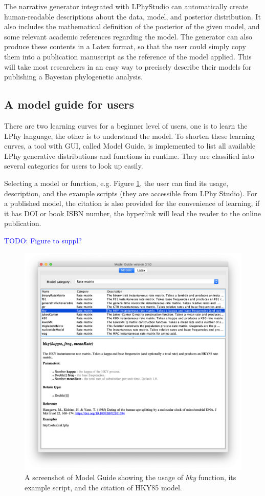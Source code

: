 \documentclass[10pt,letterpaper,table]{article}
\begin{document}
{The narrative generator integrated with LPhyStudio can automatically create human-readable descriptions about the data, model, and posterior distribution. 
It also includes the mathematical definition of the posterior of the given model, and some relevant academic references regarding the model. 
The generator can also produce these contents in a Latex format, so that the user could simply copy them into a publication manuscript as the reference of the model applied. 
This will take most researchers in an easy way to precisely describe their models for publishing a Bayesian phylogenetic analysis. 


\subsection{A model guide for users}
There are two learning curves for a beginner level of users, one is to learn the LPhy language, the other is to understand the model. To shorten these learning curves, a tool with GUI, called Model Guide, is implemented to list all available LPhy generative distributions and functions in runtime. 
They are classified into several categories for users to look up easily.

Selecting a model or function, e.g. Figure \ref{fig:modelguide}, the user can find its usage, description, and the example scripts (they are accessible from LPhy Studio). For a published model, the citation is also provided for the convenience of learning, if it has DOI or book ISBN number, the hyperlink will lead the reader to the online publication.   

\textcolor{blue}{TODO: Figure to suppl?}

\begin{figure}
  \includegraphics[width=\textwidth]{figs/modelguide.png}
  \caption{A screenshot of Model Guide showing the usage of \emph{hky} function, its example script, and the citation of HKY85 model.} 
  \label{fig:modelguide}
\end{figure}


}
\end{document}
